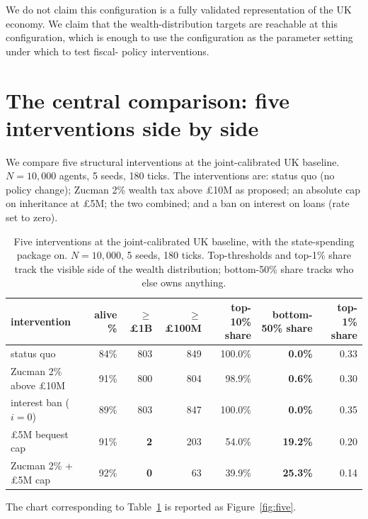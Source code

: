 \documentclass[11pt]{article}
\begin{document}
We do not claim this configuration is a fully validated representation
of the UK economy.  We claim that the wealth-distribution targets are
reachable at this configuration, which is enough to use the
configuration as the parameter setting under which to test fiscal-
policy interventions.

\section{The central comparison: five interventions side by side}
\label{sec:comparison}

We compare five structural interventions at the joint-calibrated
UK baseline.  $N = 10{,}000$ agents, 5 seeds, 180 ticks.  The
interventions are: status quo (no policy change); Zucman 2\%
wealth tax above \pounds 10M as proposed; an absolute cap on
inheritance at \pounds 5M; the two combined; and a ban on interest
on loans (rate set to zero).

\begin{table}[t]
\centering
\small
\caption{Five interventions at the joint-calibrated UK baseline,
with the state-spending package on.  $N = 10{,}000$, 5 seeds, 180
ticks.  Top-thresholds and top-1\% share track the visible side of
the wealth distribution; bottom-50\% share tracks who else owns
anything.}
\label{tab:five}
\begin{tabular}{lrrrrrr}
\toprule
intervention & alive \% & $\geq$\pounds 1B & $\geq$\pounds 100M
& top-10\% share & \textbf{bottom-50\% share} & top-1\% share \\
\midrule
status quo                & 84\% & 803 & 849 & 100.0\% & \textbf{0.0\%}  & 0.33 \\
Zucman 2\% above \pounds 10M & 91\% & 800 & 804 &  98.9\% & \textbf{0.6\%}  & 0.30 \\
interest ban ($i = 0$)    & 89\% & 803 & 847 & 100.0\% & \textbf{0.0\%}  & 0.35 \\
\pounds 5M bequest cap     & 91\% & \textbf{2}  & 203 &  54.0\% & \textbf{19.2\%} & 0.20 \\
Zucman 2\% + \pounds 5M cap & 92\% & \textbf{0}  &  63 &  39.9\% & \textbf{25.3\%} & 0.14 \\
\bottomrule
\end{tabular}
\end{table}

The chart corresponding to Table~\ref{tab:five} is reported as
Figure~\ref{fig:five}.
\end{document}
